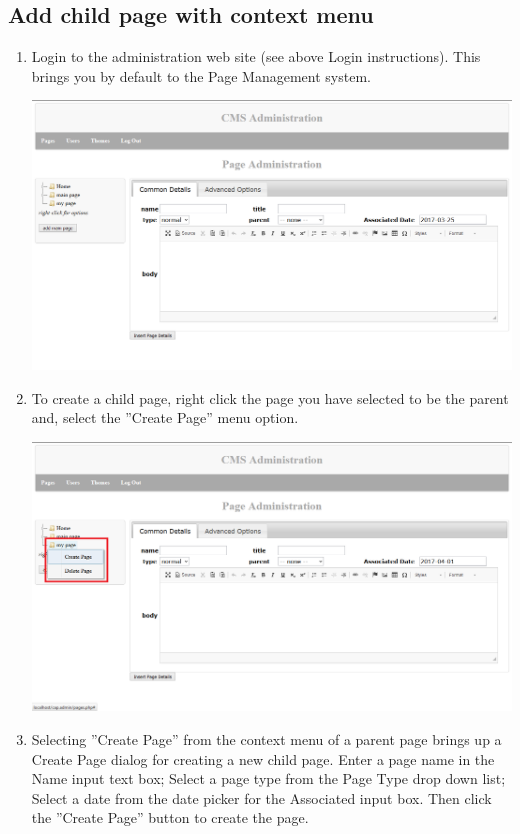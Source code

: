 \documentclass[12pt]{article}
\begin{document}
\subsection{Add child page with context menu}
\begin{enumerate}
  \item Login to the administration web site (see above Login instructions). This brings you by default to the Page Management system.
  
  \includegraphics[width=\textwidth,height=\textheight,keepaspectratio]{pics/childPageWithContextMenu_1.png}
  
  \item To create a child page, right click the page you have selected to be the parent and, select the ''Create Page'' menu option.
  
  \includegraphics[width=\textwidth,height=\textheight,keepaspectratio]{pics/childPageWithContextMenu_2.png}
  
  \item Selecting ''Create Page'' from the context menu of a parent page brings up a Create Page dialog for creating a new child page. Enter a page name in the Name input text box; Select a page type from the Page Type drop down list; Select a date from the date picker for the Associated input box. Then click the ''Create Page'' button to create the page.
  

\end{enumerate}
\end{document}
